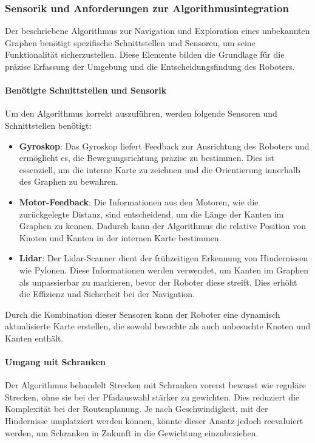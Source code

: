\documentclass[main.tex]{subfiles} %
\begin{document}
\subsubsection{Sensorik und Anforderungen zur Algorithmusintegration}

Der beschriebene Algorithmus zur Navigation und Exploration eines unbekannten
Graphen benötigt spezifische Schnittstellen und Sensoren, um seine
Funktionalität sicherzustellen. Diese Elemente bilden die Grundlage für die
präzise Erfassung der Umgebung und die Entscheidungsfindung des Roboters.

\paragraph{Benötigte Schnittstellen und Sensorik}
Um den Algorithmus korrekt auszuführen, werden folgende Sensoren und
Schnittstellen benötigt:

\begin{itemize}
  \item \textbf{Gyroskop}:
        Das Gyroskop liefert Feedback zur Ausrichtung des Roboters und
        ermöglicht es, die Bewegungsrichtung präzise zu bestimmen. Dies
        ist essenziell, um die interne Karte zu zeichnen und die
        Orientierung innerhalb des Graphen zu bewahren.

  \item \textbf{Motor-Feedback}:
        Die Informationen aus den Motoren, wie die zurückgelegte Distanz,
        sind entscheidend, um die Länge der Kanten im Graphen zu kennen.
        Dadurch kann der Algorithmus die relative Position von Knoten und
        Kanten in der internen Karte bestimmen.

  \item \textbf{Lidar}:
        Der Lidar-Scanner dient der frühzeitigen Erkennung von
        Hindernissen wie Pylonen. Diese Informationen werden verwendet,
        um Kanten im Graphen als unpassierbar zu markieren, bevor der
        Roboter diese streift. Dies erhöht die Effizienz und Sicherheit
        bei der Navigation.

\end{itemize}

Durch die Kombination dieser Sensoren kann der Roboter eine dynamisch
aktualisierte Karte erstellen, die sowohl besuchte als auch unbesuchte Knoten
und Kanten enthält.

\paragraph{Umgang mit Schranken}
Der Algorithmus behandelt Strecken mit Schranken vorerst bewusst wie reguläre
Strecken, ohne sie bei der Pfadauswahl stärker zu gewichten. Dies reduziert die
Komplexität bei der Routenplanung. Je nach Geschwindigkeit, mit der Hindernisse
umplatziert werden können, könnte dieser Ansatz jedoch reevaluiert werden, um
Schranken in Zukunft in die Gewichtung einzubeziehen.
\end{document}
